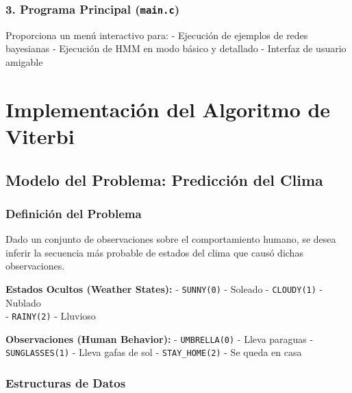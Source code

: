 \documentclass[
]{article}
\begin{document}
\subsubsection{\texorpdfstring{3. Programa Principal
(\texttt{main.c})}{3. Programa Principal (main.c)}}\label{programa-principal-main.c}

Proporciona un menú interactivo para: - Ejecución de ejemplos de redes
bayesianas - Ejecución de HMM en modo básico y detallado - Interfaz de
usuario amigable

\section{Implementación del Algoritmo de
Viterbi}\label{implementaciuxf3n-del-algoritmo-de-viterbi}

\subsection{Modelo del Problema: Predicción del
Clima}\label{modelo-del-problema-predicciuxf3n-del-clima}

\subsubsection{Definición del
Problema}\label{definiciuxf3n-del-problema}

Dado un conjunto de observaciones sobre el comportamiento humano, se
desea inferir la secuencia más probable de estados del clima que causó
dichas observaciones.

\textbf{Estados Ocultos (Weather States):} - \texttt{SUNNY(0)} - Soleado
- \texttt{CLOUDY(1)} - Nublado\\
- \texttt{RAINY(2)} - Lluvioso

\textbf{Observaciones (Human Behavior):} - \texttt{UMBRELLA(0)} - Lleva
paraguas - \texttt{SUNGLASSES(1)} - Lleva gafas de sol -
\texttt{STAY\_HOME(2)} - Se queda en casa

\subsubsection{Estructuras de Datos}\label{estructuras-de-datos}
\end{document}
